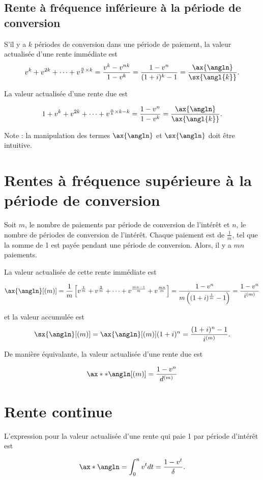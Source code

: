 \subsection{Rente à fréquence inférieure à la période de conversion}

S'il y a $k$ périodes de conversion dans une période de paiement, la valeur actualisée d'une rente immédiate est 
$$v^k + v^{2k} + \dots + v^{\frac{n}{k} \times k} = \frac{v^k - v^{nk}}{1 - v^{k}} = \frac{1 - v^n}{(1 + i)^k - 1} = \frac{\ax{\angln}}{\sx{\angl{k}}}.$$

La valeur actualisée d'une rente due est

$$1 + v^k + v^{2k} + \dots + v^{\frac{n}{k} \times k - k} = \frac{1 - v^{n}}{1 - v^{k}} =  \frac{\ax{\angln}}{\ax{\angl{k}}}.$$

Note : la manipulation des termes $\ax{\angln}$ et $\sx{\angln}$ doit être intuitive. 

\section{Rentes à fréquence supérieure à la période de conversion}

Soit $m$, le nombre de paiements par période de conversion de l'intérêt et $n$, le nombre de périodes de conversion de l'intérêt. Chaque paiement est de $\frac{1}{m}$, tel que la somme de 1 est payée pendant une période de conversion. Alors, il y a $mn$ paiements. 

La valeur actualisée de cette rente immédiate est 

$$\ax{\angln}[(m)] = \frac{1}{m}\left[v^{\frac{1}{m}} + v^{\frac{2}{m}} + \dots + v^{\frac{mn-1}{m}} + v^{\frac{mn}{m}} \right]= \frac{1 - v^n}{m\left((1 + i)^{\frac{1}{m}} - 1\right)} = \frac{1-v^n}{i^{(m)}}$$

et la valeur accumulée est 
$$\sx{\angln}[(m)] = \ax{\angln}[(m)] (1 + i)^n = \frac{(1 + i)^n - 1}{i^{(m)}}.$$

De manière équivalante, la valeur actualisée d'une rente due est

$$\ax**{\angln}[(m)] = \frac{1-v^n}{d^{(m)}}$$

\section{Rente continue}

L'expression pour la valeur actualisée d'une rente qui paie 1 par période d'intérêt est 

$$\ax*{\angln} = \int_{0}^{n}v^t dt = \frac{1 - v^t}{\delta}.$$

